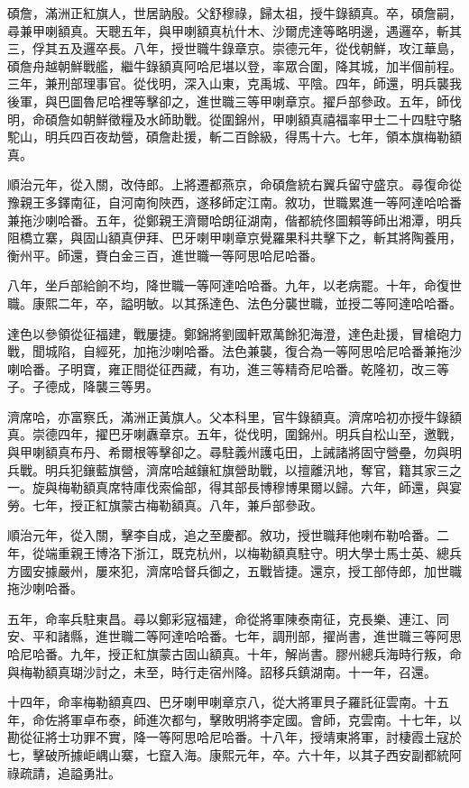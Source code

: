 \begin{pinyinscope}
碩詹，滿洲正紅旗人，世居訥殷。父舒穆祿，歸太祖，授牛錄額真。卒，碩詹嗣，尋兼甲喇額真。天聰五年，與甲喇額真杭什木、沙爾虎達等略明邊，遇邏卒，斬其三，俘其五及邏卒長。八年，授世職牛錄章京。崇德元年，從伐朝鮮，攻江華島，碩詹舟越朝鮮戰艦，繼牛錄額真阿哈尼堪以登，率眾合圍，降其城，加半個前程。三年，兼刑部理事官。從伐明，深入山東，克禹城、平陰。四年，師還，明兵襲我後軍，與巴圖魯尼哈裡等擊卻之，進世職三等甲喇章京。擢戶部參政。五年，師伐明，命碩詹如朝鮮徵糧及水師助戰。從圍錦州，甲喇額真禧福率甲士二十四駐守駱駝山，明兵四百夜劫營，碩詹赴援，斬二百餘級，得馬十六。七年，領本旗梅勒額真。

順治元年，從入關，改侍郎。上將遷都燕京，命碩詹統右翼兵留守盛京。尋復命從豫親王多鐸南征，自河南徇陜西，遂移師定江南。敘功，世職累進一等阿達哈哈番兼拖沙喇哈番。五年，從鄭親王濟爾哈朗征湖南，偕都統佟圖賴等師出湘潭，明兵阻橋立寨，與固山額真伊拜、巴牙喇甲喇章京覺羅果科共擊下之，斬其將陶養用，衡州平。師還，賚白金三百，進世職一等阿思哈尼哈番。

八年，坐戶部給餉不均，降世職一等阿達哈哈番。九年，以老病罷。十年，命復世職。康熙二年，卒，謚明敏。以其孫達色、法色分襲世職，並授二等阿達哈哈番。

達色以參領從征福建，戰屢捷。鄭錦將劉國軒眾萬餘犯海澄，達色赴援，冒槍砲力戰，聞城陷，自經死，加拖沙喇哈番。法色兼襲，復合為一等阿思哈尼哈番兼拖沙喇哈番。子明寶，雍正間從征西藏，有功，進三等精奇尼哈番。乾隆初，改三等子。子德成，降襲三等男。

濟席哈，亦富察氏，滿洲正黃旗人。父本科里，官牛錄額真。濟席哈初亦授牛錄額真。崇德四年，擢巴牙喇纛章京。五年，從伐明，圍錦州。明兵自松山至，邀戰，與甲喇額真布丹、希爾根等擊卻之。尋駐義州護屯田，上誡諸將固守營壘，勿與明兵戰。明兵犯鑲藍旗營，濟席哈越鑲紅旗營助戰，以擅離汛地，奪官，籍其家三之一。旋與梅勒額真席特庫伐索倫部，得其部長博穆博果爾以歸。六年，師還，與宴勞。七年，授正紅旗蒙古梅勒額真。八年，兼戶部參政。

順治元年，從入關，擊李自成，追之至慶都。敘功，授世職拜他喇布勒哈番。二年，從端重親王博洛下浙江，既克杭州，以梅勒額真駐守。明大學士馬士英、總兵方國安據嚴州，屢來犯，濟席哈督兵御之，五戰皆捷。還京，授工部侍郎，加世職拖沙喇哈番。

五年，命率兵駐東昌。尋以鄭彩寇福建，命從將軍陳泰南征，克長樂、連江、同安、平和諸縣，進世職二等阿達哈哈番。七年，調刑部，擢尚書，進世職三等阿思哈尼哈番。九年，授正紅旗蒙古固山額真。十年，解尚書。膠州總兵海時行叛，命與梅勒額真瑚沙討之，未至，時行走宿州降。詔移兵鎮湖南。十一年，召還。

十四年，命率梅勒額真四、巴牙喇甲喇章京八，從大將軍貝子羅託征雲南。十五年，命佐將軍卓布泰，師進次都勻，擊敗明將李定國。會師，克雲南。十七年，以勘從征將士功罪不實，降一等阿思哈尼哈番。十八年，授靖東將軍，討棲霞土寇於七，擊破所據岠嵎山寨，七竄入海。康熙元年，卒。六十年，以其子西安副都統阿祿疏請，追謚勇壯。


\end{pinyinscope}
